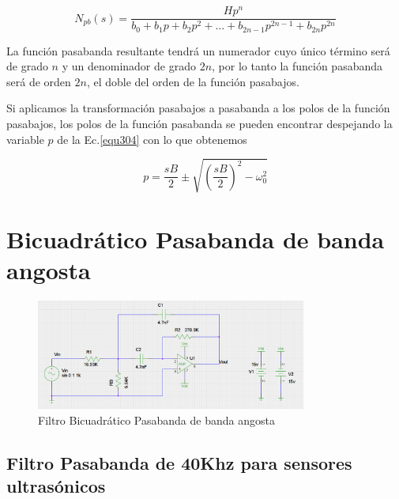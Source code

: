 \documentclass[12pt]{book}
\theoremstyle{definition}
\theoremstyle{remark}
\theoremstyle{plain}
\begin{document}
\begin{equation}
 N_{pb}(s)=\frac{H p^n}{b_0+b_1 p+b_2 p^2+...+b_{2n-1}p^{2n-1}+b_{2n} p^{2n}}
\label{equ306}
\end{equation}

La función pasabanda resultante tendrá un numerador cuyo único término será de grado $n$ y un denominador de grado $2n$, por lo tanto 
la función pasabanda será de orden $2n$, el doble del orden de la función pasabajos.

Si aplicamos la transformación pasabajos a pasabanda a los polos de la función pasabajos, los polos de la función pasabanda se pueden 
encontrar despejando la variable $p$ de la Ec.\ref{equ304} con lo que obtenemos

\begin{equation}
 p= \frac{s B}{2}\pm \sqrt{\left(\frac{s B}{2}\right)^2-\omega _0^2}
\label{equ307}
\end{equation}


\section{Bicuadrático Pasabanda de banda angosta}

\begin{figure}
\centering
\includegraphics[width=3.5in]{BicuadPasabanda.png}
\caption{Filtro Bicuadrático Pasabanda de banda angosta}
\label{fig12}
\end{figure}

\subsection{Filtro Pasabanda de 40Khz para sensores ultrasónicos}


\backmatter
\end{document}
